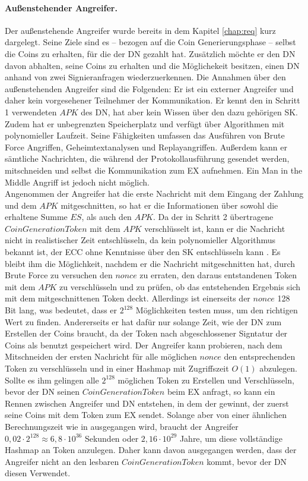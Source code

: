 \documentclass[
	fontsize=11pt,
	headings=small,
	parskip=half,           %
	bibliography=totoc,
	numbers=noenddot,       %
	open=any,               %
]{scrreprt}
\begin{document}
\paragraph{Außenstehender Angreifer.} Der außenstehende Angreifer wurde bereits in dem Kapitel \ref{chap:req} kurz dargelegt. Seine Ziele sind es -- bezogen auf die Coin Generierungsphase -- selbst die Coins zu erhalten, für die der DN gezahlt hat. Zusätzlich möchte er den DN davon abhalten, seine Coins zu erhalten und die Möglichekeit besitzen, einen DN anhand von zwei Signieranfragen wiederzuerkennen. Die Annahmen über den außenstehenden Angreifer sind die Folgenden: Er ist ein externer Angreifer und daher kein vorgesehener Teilnehmer der Kommunikation. Er kennt den in Schritt 1 verwendeten $APK$ des DN, hat aber kein Wissen über den dazu gehörigen SK. Zudem hat er unbegrenzten Speicherplatz und verfügt über Algorithmen mit polynomieller Laufzeit. Seine Fähigkeiten umfassen das Ausführen von Brute Force Angriffen, Geheimtextanalysen und Replayangriffen. Außerdem kann er sämtliche Nachrichten, die während der Protokollausführung gesendet werden, mitschneiden und selbst die Kommunikation zum EX aufnehmen. Ein Man in the Middle Angriff ist jedoch nicht möglich.\\

Angenommen der Angreifer hat die erste Nachricht mit dem Eingang der Zahlung und dem $APK$ mitgeschnitten, so hat er die Informationen über sowohl die erhaltene Summe $ES$, als auch den $APK$. Da der in Schritt 2 übertragene $CoinGenerationToken$ mit dem $APK$ verschlüsselt ist, kann er die Nachricht nicht in realistischer Zeit entschlüsseln, da kein polynomieller Algorithmus bekannt ist, der ECC ohne Kenntnisse über den SK entschlüsseln kann \cite{ecc-bos2009security}. Es bleibt ihm die Möglichkeit, nachdem er die Nachricht mitgeschnitten hat, durch Brute Force zu versuchen den $nonce$ zu erraten, den daraus entstandenen Token mit dem $APK$ zu verschlüsseln und zu prüfen, ob das entstehenden Ergebnis sich mit dem mitgeschnittenen Token deckt. Allerdings ist einerseits der $nonce$ 128 Bit lang, was bedeutet, dass er $2^{128}$ Möglichkeiten testen muss, um den richtigen Wert zu finden. Andererseits er hat dafür nur solange Zeit, wie der DN zum Erstellen der Coins braucht, da der Token nach abgeschlossener Signtatur der Coins als benutzt gespeichert wird. Der Angreifer kann probieren, nach dem Mitschneiden der ersten Nachricht für alle möglichen $nonce$ den entsprechenden Token zu verschlüsseln und in einer Hashmap mit Zugriffszeit $O(1)$ abzulegen. Sollte es ihm gelingen alle $2^{128}$ möglichen Token zu Erstellen und Verschlüsseln, bevor der DN seinen $CoinGenerationToken$ beim EX anfragt, so kann ein Rennen zwischen Angreifer und DN entstehen, in dem der gewinnt, der zuerst seine Coins mit dem Token zum EX sendet. Solange aber von einer ähnlichen Berechnungszeit wie in \cite{nofriansyah2018efficiency} ausgegangen wird, braucht der Angreifer $0,02 \cdot 2^{128}\approx 6,8\cdot10^{36}$ Sekunden oder $2,16\cdot10^{29}$ Jahre, um diese vollständige Hashmap an Token anzulegen. Daher kann davon ausgegangen werden, dass der Angreifer nicht an den lesbaren $CoinGenerationToken$ kommt, bevor der DN diesen Verwendet.\\
\end{document}
